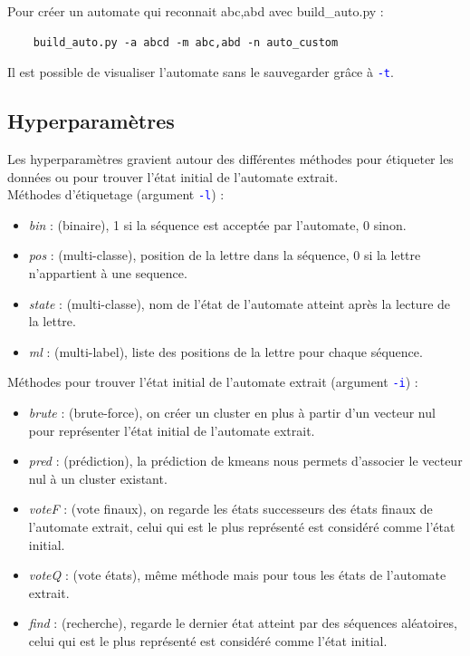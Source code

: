 \documentclass{article}
\newcommand{\cmd}[1]{\texttt{\textcolor{blue}{#1}}}
\begin{document}
\vspace{0.3cm}
\noindent Pour créer un automate qui reconnait abc,abd avec build\_auto.py :
{\color{blue}
\begin{verbatim}
    build_auto.py -a abcd -m abc,abd -n auto_custom
\end{verbatim}}
\noindent Il est possible de visualiser l'automate sans le sauvegarder grâce à \cmd{-t}.




\newpage
\subsection*{Hyperparamètres}
Les hyperparamètres gravient autour des différentes méthodes pour
étiqueter les données ou pour trouver l'état initial de l'automate extrait.
\\Méthodes d'étiquetage (argument \cmd{-l}) :
\begin{itemize}
    \item \textit{bin} : (binaire), 1 si la séquence est acceptée par l'automate, 0 sinon.
    \item \textit{pos} : (multi-classe), position de la lettre dans la séquence, 0 si la lettre n'appartient à une sequence.
    \item \textit{state} : (multi-classe), nom de l'état de l'automate atteint après la lecture de la lettre.
    \item \textit{ml} : (multi-label), liste des positions de la lettre pour chaque séquence.
\end{itemize}

\noindent Méthodes pour trouver l'état initial de l'automate extrait (argument \cmd{-i}) :
\begin{itemize}
    \item \textit{brute} : (brute-force), on créer un cluster en plus à partir d'un vecteur nul pour représenter l'état initial de l'automate extrait.
    \item \textit{pred} : (prédiction), la prédiction de kmeans nous permets d'associer le vecteur nul à un cluster existant.
    \item \textit{voteF} : (vote finaux), on regarde les états successeurs des états finaux de l'automate extrait, celui qui est le plus représenté est considéré comme l'état initial.
    \item \textit{voteQ} : (vote états), même méthode mais pour tous les états de l'automate extrait.
    \item \textit{find} : (recherche), regarde le dernier état atteint par des séquences aléatoires, celui qui est le plus représenté est considéré comme l'état initial.
\end{itemize}
\end{document}
